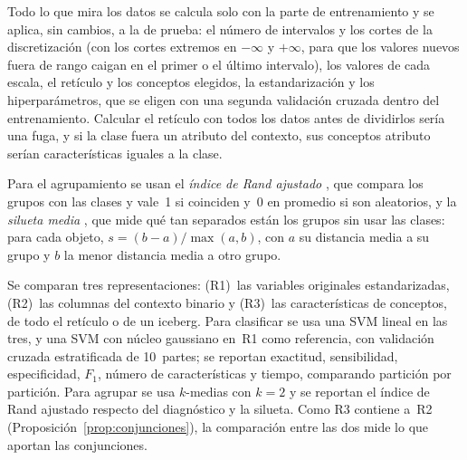 \begin{observacion}\label{obs:fuga}
Todo lo que mira los datos se calcula solo con la parte de entrenamiento y se aplica, sin cambios, a la de prueba: el número de intervalos y los cortes de la discretización (con los cortes extremos en $-\infty$ y $+\infty$, para que los valores nuevos fuera de rango caigan en el primer o el último intervalo), los valores de cada escala, el retículo y los conceptos elegidos, la estandarización y los hiperparámetros, que se eligen con una segunda validación cruzada dentro del entrenamiento. Calcular el retículo con todos los datos antes de dividirlos sería una fuga, y si la clase fuera un atributo del contexto, sus conceptos atributo serían características iguales a la clase.
\end{observacion}

Para el agrupamiento se usan el \emph{índice de Rand ajustado} \parencite{hubert1985}, que compara los grupos con las clases y vale~1 si coinciden y~0 en promedio si son aleatorios, y la \emph{silueta media} \parencite{rousseeuw1987}, que mide qué tan separados están los grupos sin usar las clases: para cada objeto, $s = (b - a)/\max(a, b)$, con $a$ su distancia media a su grupo y $b$ la menor distancia media a otro grupo.

\begin{observacion}\label{obs:diseno}
Se comparan tres representaciones: (R1)~las variables originales estandarizadas, (R2)~las columnas del contexto binario y (R3)~las características de conceptos, de todo el retículo o de un iceberg. Para clasificar se usa una SVM lineal en las tres, y una SVM con núcleo gaussiano en~R1 como referencia, con validación cruzada estratificada de 10~partes; se reportan exactitud, sensibilidad, especificidad, $F_1$, número de características y tiempo, comparando partición por partición. Para agrupar se usa $k$-medias con $k = 2$ y se reportan el índice de Rand ajustado respecto del diagnóstico y la silueta. Como R3 contiene a~R2 (Proposición~\ref{prop:conjunciones}), la comparación entre las dos mide lo que aportan las conjunciones.
\end{observacion}

